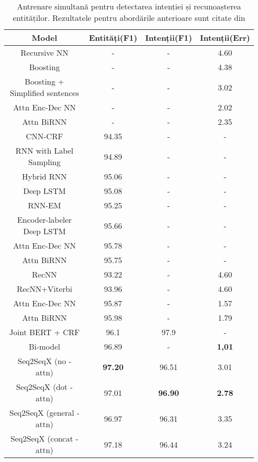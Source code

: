 \bigskip
\begin{table}[htp]
	\small
	\centering
	\begin{tabular}{ c c c c} 
		\hline
		\textbf{Model} 		 & \textbf{Entități(F1)} & \textbf{Intenții(F1)} & \textbf{Intenții(Err)} \\
		\hline
		\hline
		Recursive NN \cite{recursive-nn-intent} & - & - & 4.60 \\
		Boosting \cite{boosting-intent} & - & - & 4.38 \\
		Boosting + Simplified sentences \cite{boostingplus-intent} & - & - & 3.02 \\
		Attn Enc-Dec NN \cite{att_joint_bing} & - & - & 2.02 \\
		Attn BiRNN \cite{att_joint_bing} & - & - & 2.35 \\
		\hline
		\hline
		CNN-CRF \cite{sarika-cnn-crf} & 94.35 & - & - \\
		RNN with Label Sampling \cite{rnn-label-samp} & 94.89 & - & - \\
		Hybrid RNN \cite{mesnil-rnn-crf} & 95.06 & - & - \\
		Deep LSTM \cite{deep-lstm} & 95.08 & - & - \\
		RNN-EM \cite{rnn-em} & 95.25 & - & - \\
		Encoder-labeler Deep LSTM \cite{ecn-deep-lstm} & 95.66 & - & - \\
		Attn Enc-Dec NN \cite{att_joint_bing} & 95.78 & - & - \\
		Attn BiRNN \cite{att_joint_bing} & 95.75 & - & - \\
		\hline
		\hline
		RecNN \cite{recursive-nn-intent} & 93.22 & - & 4.60 \\
		RecNN+Viterbi \cite{recursive-nn-intent} & 93.96 & - & 4.60 \\
		Attn Enc-Dec NN \cite{att_joint_bing} & 95.87 & - & 1.57 \\
		Attn BiRNN \cite{att_joint_bing} & 95.98 & - & 1.79 \\
		Joint BERT + CRF \cite{joint-bert} & 96.1 & 97.9 & - \\
		Bi-model \cite{bi-model} & 96.89 & - & \textbf{1,01} \\
		\hline
		Seq2SeqX (no - attn) & \textbf{97.20} & 96.51 & 3.01 \\ %
		Seq2SeqX (dot - attn) & 97.01 & \textbf{96.90} & \textbf{2.78} \\ %
		Seq2SeqX (general - attn) & 96.97 & 96.31 & 3.35 \\ %
		Seq2SeqX (concat - attn) & 97.18 & 96.44 & 3.24 \\ %
		\hline
	\end{tabular}
	\caption{Antrenare simultană pentru detectarea intenției și recunoașterea entităților. Rezultatele pentru abordările anterioare sunt citate din \cite{att_joint_bing}}
	\label{rezultate1}
\end{table}

